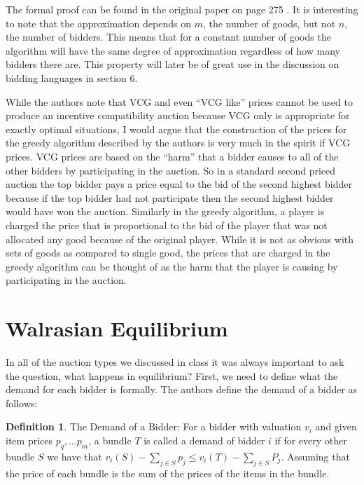 \documentclass[10pt,onecolumn,letterpaper]{article}
\theoremstyle{definition}
\newtheorem{definition}{Definition}[section]
\begin{document}
The formal proof can be found in the original paper on page 275 \cite{paper}. It is interesting to note that the approximation depends on $m$, the number of goods, but not $n$, the number of bidders. This means that for a constant number of goods the algorithm will have the same degree of approximation regardless of how many bidders there are. This property will later be of great use in the discussion on bidding languages in section 6. 

While the authors note that VCG and even ``VCG like'' prices cannot be used to produce an incentive compatibility auction because VCG only is appropriate for exactly optimal situations, I would argue that the construction of the prices for the greedy algorithm described by the authors is very much in the spirit if VCG prices. VCG prices are based on the ``harm'' that a bidder causes to all of the other bidders by participating in the auction. So in a standard second priced auction the top bidder pays a price equal to the bid of the second highest bidder because if the top bidder had not participate then the second highest bidder would have won the auction. Similarly in the greedy algorithm, a player is charged the price that is proportional to the bid of the player that was not allocated any good because of the original player. While it is not as obvious with sets of goods as compared to single good, the prices that are charged in the greedy algorithm can be thought of as the harm that the player is causing by participating in the auction. 

\section{Walrasian Equilibrium} %

In all of the auction types we discussed in class it was always important to ask the question, what happens in equilibrium? First, we need to define what the demand for each bidder is formally. The authors define the demand of a bidder as follows:

\theoremstyle{definition}
\begin{definition}{The Demand of a Bidder:} For a bidder with valuation $v_i$ and given item prices $p_q,...p_m$, a bundle $T$ is called a demand of bidder $i$ if for every other bundle $S$ we have that $v_i(S) - \sum_{j \in S} p_j \leq v_i(T) - \sum_{j \in S} P_j$. Assuming that the price of each bundle is the sum of the prices of the items in the bundle.
\end{definition}
\end{document}
